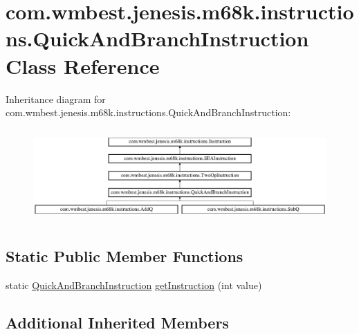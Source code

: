 \hypertarget{classcom_1_1wmbest_1_1jenesis_1_1m68k_1_1instructions_1_1QuickAndBranchInstruction}{\section{com.\-wmbest.\-jenesis.\-m68k.\-instructions.\-Quick\-And\-Branch\-Instruction Class Reference}
\label{classcom_1_1wmbest_1_1jenesis_1_1m68k_1_1instructions_1_1QuickAndBranchInstruction}
}
Inheritance diagram for com.\-wmbest.\-jenesis.\-m68k.\-instructions.\-Quick\-And\-Branch\-Instruction\-:\begin{figure}[H]
\begin{center}
\leavevmode
\includegraphics[height=3.580563cm]{classcom_1_1wmbest_1_1jenesis_1_1m68k_1_1instructions_1_1QuickAndBranchInstruction}
\end{center}
\end{figure}
\subsection*{Static Public Member Functions}
\begin{DoxyCompactItemize}
\item 
static \hyperlink{classcom_1_1wmbest_1_1jenesis_1_1m68k_1_1instructions_1_1QuickAndBranchInstruction}{Quick\-And\-Branch\-Instruction} \hyperlink{classcom_1_1wmbest_1_1jenesis_1_1m68k_1_1instructions_1_1QuickAndBranchInstruction_a926e056f81d08cc66c893fcce53bce6a}{get\-Instruction} (int value)
\end{DoxyCompactItemize}
\subsection*{Additional Inherited Members}


